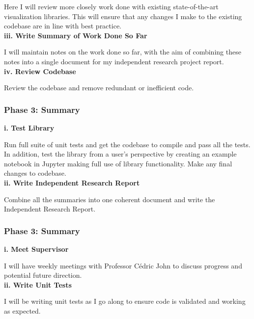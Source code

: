 \documentclass[12pt]{article}
\begin{document}
Here I will review more closely work done with existing state-of-the-art visualization libraries. This will ensure that any changes I make to the existing codebase are in line with best practice. \\

\textbf{iii. Write Summary of Work Done So Far}

I will maintain notes on the work done so far, with the aim of combining these notes into a single document for my independent research project report. \\

\textbf{iv. Review Codebase}

Review the codebase and remove redundant or inefficient code. \\

\subsubsection{Phase 3: Summary}

\textbf{i. Test Library}

Run full suite of unit tests and get the codebase to compile and pass all the tests. In addition, test the library from a user's perspective by creating an example notebook in Jupyter making full use of library functionality. Make any final changes to codebase. \\

\textbf{ii. Write Independent Research Report}

Combine all the summaries into one coherent document and write the Independent Research Report. \\

\subsubsection{Phase 3: Summary}

\textbf{i. Meet Supervisor}

I will have weekly meetings with Professor Cédric John to discuss progress and potential future direction.  \\

\textbf{ii. Write Unit Tests}

I will be writing unit tests as I go along to ensure code is validated and working as expected. \\


\pagebreak
\printbibliography
\end{document}
